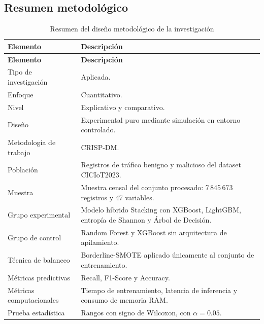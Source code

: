 \documentclass[12pt,a4paper]{article}
\begin{document}
\subsection{Resumen metodológico}

\begin{longtable}{p{4cm}p{8.5cm}}
\caption{Resumen del diseño metodológico de la investigación} \\
\toprule
\textbf{Elemento} & \textbf{Descripción} \\
\midrule
\endfirsthead
\toprule
\textbf{Elemento} & \textbf{Descripción} \\
\midrule
\endhead
Tipo de investigación & Aplicada. \\
Enfoque & Cuantitativo. \\
Nivel & Explicativo y comparativo. \\
Diseño & Experimental puro mediante simulación en entorno controlado. \\
Metodología de trabajo & CRISP-DM. \\
Población & Registros de tráfico benigno y malicioso del dataset CICIoT2023. \\
Muestra & Muestra censal del conjunto procesado: 7\,845\,673 registros y 47 variables. \\
Grupo experimental & Modelo híbrido Stacking con XGBoost, LightGBM, entropía de Shannon y Árbol de Decisión. \\
Grupo de control & Random Forest y XGBoost sin arquitectura de apilamiento. \\
Técnica de balanceo & Borderline-SMOTE aplicado únicamente al conjunto de entrenamiento. \\
Métricas predictivas & Recall, F1-Score y Accuracy. \\
Métricas computacionales & Tiempo de entrenamiento, latencia de inferencia y consumo de memoria RAM. \\
Prueba estadística & Rangos con signo de Wilcoxon, con $\alpha = 0.05$. \\
\bottomrule
\end{longtable}
\end{document}
